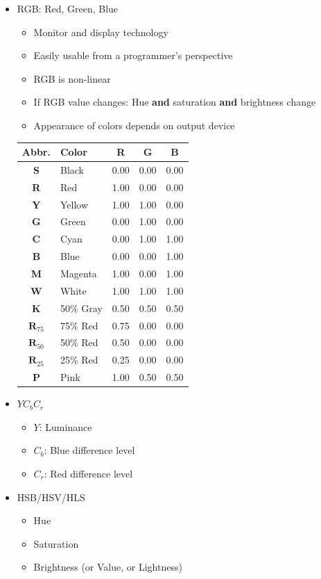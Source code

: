 \documentclass{scrartcl}
\begin{document}
\begin{itemize}
	\item RGB: Red, Green, Blue
	\begin{itemize}
		\item Monitor and display technology
		\item Easily usable from a programmer's perspective
		\item RGB is non-linear
		\item If RGB value changes: Hue \textbf{and} saturation \textbf{and} brightness change
		\item Appearance of colors depends on output device
	\end{itemize}	\begin{tabular}{|c|l||c|c|c|}
		\hline 
		Abbr. & Color & R & G & B \\ 
		\hline 
		\textbf{S} & Black & 0.00 & 0.00 & 0.00 \\ 
		\textbf{R} & Red & 1.00 & 0.00 & 0.00 \\ 
		\textbf{Y} & Yellow & 1.00 & 1.00 & 0.00 \\ 
		\textbf{G} & Green & 0.00 & 1.00 & 0.00 \\ 
		\textbf{C} & Cyan & 0.00 & 1.00 & 1.00 \\ 
		\textbf{B} & Blue & 0.00 & 0.00 & 1.00 \\ 
		\textbf{M} & Magenta & 1.00 & 0.00 & 1.00 \\ 
		\textbf{W} & White & 1.00 & 1.00 & 1.00 \\ 
		\hline 
		\textbf{K} & 50\% Gray & 0.50 & 0.50 & 0.50 \\ 
		\hline 
		$ \mathbf{R}_{75} $ & 75\% Red & 0.75 & 0.00 & 0.00 \\ 
		$ \mathbf{R}_{50} $ & 50\% Red & 0.50 & 0.00 & 0.00 \\ 
		$ \mathbf{R}_{25} $ & 25\% Red & 0.25 & 0.00 & 0.00 \\ 
		\hline 
		\textbf{P} & Pink & 1.00 & 0.50 & 0.50 \\ 
		\hline 
	\end{tabular} 
	\item $ YC_bC_r $
	\begin{itemize}
		\item $ Y $: Luminance
		\item $ C_b $: Blue difference level
		\item $ C_r $: Red difference level
	\end{itemize}
	\item HSB/HSV/HLS
	\begin{itemize}
		\item Hue
		\item Saturation
		\item Brightness (or Value, or Lightness)
	\end{itemize}
\end{itemize}
\end{document}
